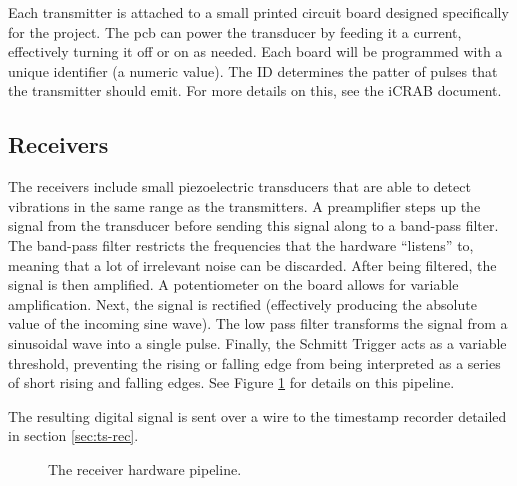 \documentclass[12pt]{article}
\begin{document}
Each transmitter is attached to a small printed circuit board designed
specifically for the project.
The \gls{pcb} can power the transducer by feeding it a current, effectively
turning it off or on as needed.
Each board will be programmed with a unique identifier (a numeric value).
The ID determines the patter of pulses that the transmitter should emit.
For more details on this, see the \gls{iCRAB} document.

\subsection{Receivers}

The receivers include small piezoelectric transducers that are able to detect
vibrations in the same range as the transmitters.
A preamplifier steps up the signal from the transducer before sending this
signal along to a band-pass filter.
The band-pass filter restricts the frequencies that the hardware ``listens''
to, meaning that a lot of irrelevant noise can be discarded.
After being filtered, the signal is then amplified.
A potentiometer on the board allows for variable amplification.
Next, the signal is
rectified (effectively producing the absolute value of the incoming sine wave).
The low pass filter transforms the signal from a sinusoidal wave into a single
pulse.
Finally, the Schmitt Trigger acts as a variable threshold, preventing the
rising or falling edge from being interpreted as a series of short rising and
falling edges.
See Figure \ref{fig:rx-detail} for details on this pipeline.

The resulting digital signal is sent over a wire to the timestamp
recorder detailed in section \ref{sec:ts-rec}.

\begin{figure}[h]
\begin{center}
\end{center}
\caption{The receiver hardware pipeline.}
\label{fig:rx-detail}
\end{figure}
\end{document}
